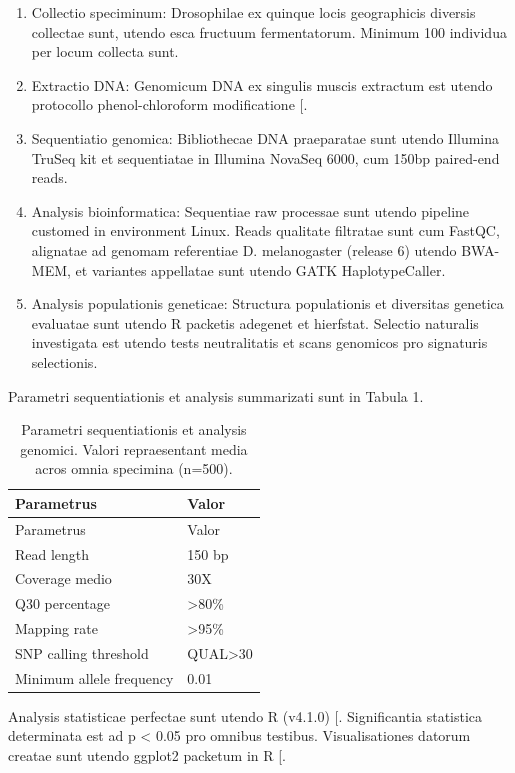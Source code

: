 \documentclass[
]{article}
\begin{document}
\begin{enumerate}
\def\labelenumi{\arabic{enumi}.}
\item
  Collectio speciminum: Drosophilae ex quinque locis geographicis
  diversis collectae sunt, utendo esca fructuum fermentatorum. Minimum
  100 individua per locum collecta sunt.
\item
  Extractio DNA: Genomicum DNA ex singulis muscis extractum est utendo
  protocollo phenol-chloroform modificatione
  {[}\citeproc{ref-Smith_et_al_2020}{2}{]}.
\item
  Sequentiatio genomica: Bibliothecae DNA praeparatae sunt utendo
  Illumina TruSeq kit et sequentiatae in Illumina NovaSeq 6000, cum
  150bp paired-end reads.
\item
  Analysis bioinformatica: Sequentiae raw processae sunt utendo pipeline
  customed in environment Linux. Reads qualitate filtratae sunt cum
  FastQC, alignatae ad genomam referentiae D. melanogaster (release 6)
  utendo BWA-MEM, et variantes appellatae sunt utendo GATK
  HaplotypeCaller.
\item
  Analysis populationis geneticae: Structura populationis et diversitas
  genetica evaluatae sunt utendo R packetis adegenet et hierfstat.
  Selectio naturalis investigata est utendo tests neutralitatis et scans
  genomicos pro signaturis selectionis.
\end{enumerate}

Parametri sequentiationis et analysis summarizati sunt in Tabula 1.

\begin{longtable}[]{@{}ll@{}}
\caption{\label{tbl:seqparams}Parametri sequentiationis et analysis
genomici. Valori repraesentant media acros omnia specimina
(n=500).}\tabularnewline
\toprule\noalign{}
Parametrus & Valor \\
\midrule\noalign{}
\endfirsthead
\toprule\noalign{}
Parametrus & Valor \\
\midrule\noalign{}
\endhead
\bottomrule\noalign{}
\endlastfoot
Read length & 150 bp \\
Coverage medio & 30X \\
Q30 percentage & \textgreater80\% \\
Mapping rate & \textgreater95\% \\
SNP calling threshold & QUAL\textgreater30 \\
Minimum allele frequency & 0.01 \\
\end{longtable}

Analysis statisticae perfectae sunt utendo R (v4.1.0)
{[}\citeproc{ref-R_Core_Team_2021}{3}{]}. Significantia statistica
determinata est ad p \textless{} 0.05 pro omnibus testibus.
Visualisationes datorum creatae sunt utendo ggplot2 packetum in R
{[}\citeproc{ref-Wickham_2016}{4}{]}.
\end{document}
